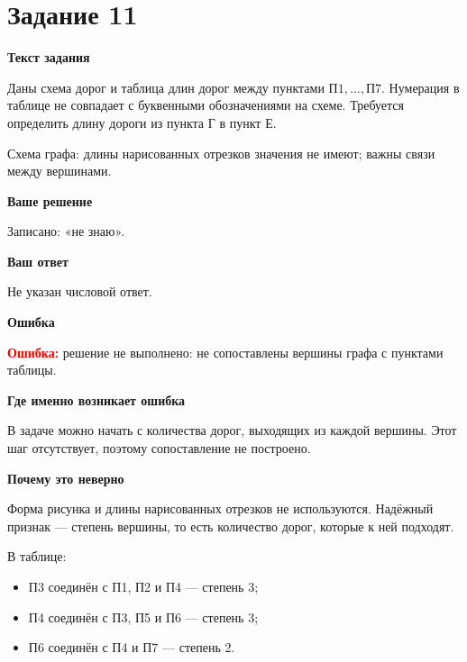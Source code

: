 \documentclass[12pt,a4paper]{article}
\newcommand{\errorlabel}{\textcolor{red}{\textbf{Ошибка:}}}
\newcommand{\subhead}[1]{\par\medskip\textbf{#1}\par}
\begin{document}
\newpage
{}\label{task:11}
\section*{Задание 11}

\subhead{Текст задания}
Даны схема дорог и таблица длин дорог между пунктами $\text{П1},\ldots,\text{П7}$. Нумерация в таблице не совпадает с буквенными обозначениями на схеме. Требуется определить длину дороги из пункта Г в пункт Е.


\begin{center}

\small Схема графа: длины нарисованных отрезков значения не имеют; важны связи между вершинами.
\end{center}

\subhead{Ваше решение}
Записано: «не знаю».

\subhead{Ваш ответ}
Не указан числовой ответ.

\subhead{Ошибка}
\errorlabel{} решение не выполнено: не сопоставлены вершины графа с пунктами таблицы.

\subhead{Где именно возникает ошибка}
В задаче можно начать с количества дорог, выходящих из каждой вершины. Этот шаг отсутствует, поэтому сопоставление не построено.

\subhead{Почему это неверно}
Форма рисунка и длины нарисованных отрезков не используются. Надёжный признак --- степень вершины, то есть количество дорог, которые к ней подходят.

В таблице:
\begin{itemize}
\item П3 соединён с П1, П2 и П4 --- степень 3;
\item П4 соединён с П3, П5 и П6 --- степень 3;
\item П6 соединён с П4 и П7 --- степень 2.
\end{itemize}
\end{document}
